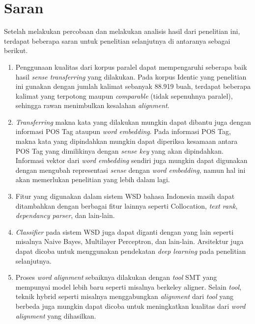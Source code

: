 \section{Saran}
Setelah melakukan percobaan dan melakukan analisis hasil dari penelitian ini, terdapat beberapa saran untuk penelitian selanjutnya di antaranya sebagai berikut.

\begin{enumerate}
	\item Penggunaan kualitas dari korpus paralel dapat mempengaruhi seberapa baik hasil \textit{sense transferring} yang dilakukan. Pada korpus Identic yang penelitian ini gunakan dengan jumlah kalimat sebanyak 88.919 buah, terdapat beberapa kalimat yang terpotong maupun \textit{comparable} (tidak sepenuhnya paralel), sehingga rawan menimbulkan kesalahan \textit{alignment}.
	\item \textit{Transferring} makna kata yang dilakukan mungkin dapat dibantu juga dengan informasi POS Tag ataupun \textit{word embedding}. Pada informasi POS Tag, makna kata yang dipindahkan mungkin dapat diperiksa kesamaan antara POS Tag yang dimilikinya dengan \textit{sense key} yang akan dipindahkan. Informasi vektor dari \textit{word embedding} sendiri juga mungkin dapat digunakan dengan mengubah representasi \textit{sense} dengan \textit{word embedding}, namun hal ini akan memerlukan penelitian yang lebih dalam lagi.
	\item Fitur yang digunakan dalam sistem WSD bahasa Indonesia masih dapat ditambahkan dengan berbagai fitur lainnya seperti Collocation, \textit{text rank}, \textit{dependancy parser}, dan lain-lain.
	\item \textit{Classifier} pada sistem WSD juga dapat diganti dengan yang lain seperti misalnya Naive Bayes, Multilayer Perceptron, dan lain-lain. Arsitektur juga dapat dicoba untuk menggunakan pendekatan \textit{deep learning} pada penelitian selanjutnya.
	\item Proses \textit{word alignment} sebaiknya dilakukan dengan \textit{tool} SMT yang mempunyai model lebih baru seperti misalnya berkeley aligner. Selain \textit{tool}, teknik hybrid seperti misalnya menggabungkan \textit{alignment} dari \textit{tool} yang berbeda juga mungkin dapat dicoba untuk meningkatkan kualitas dari \textit{word alignment} yang dihasilkan.
\end{enumerate}